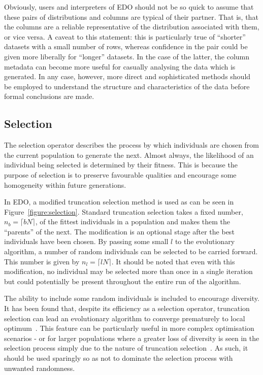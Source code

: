 Obviously, users and interpreters of EDO should not be so quick to assume that
these pairs of distributions and columns are typical of their partner. That is,
that the columns are a reliable representative of the distribution associated
with them, or vice versa. A caveat to this statement: this is particularly true
of ``shorter'' datasets with a small number of rows, whereas confidence in the
pair could be given more liberally for ``longer'' datasets. In the case of the
latter, the column metadata can become more useful for casually analysing the
data which is generated. In any case, however, more direct and sophisticated
methods should be employed to understand the structure and characteristics of
the data before formal conclusions are made.



\subsection{Selection}

The selection operator describes the process by which individuals are chosen
from the current population to generate the next. Almost always, the likelihood
of an individual being selected is determined by their fitness. This is because
the purpose of selection is to preserve favourable qualities and encourage some
homogeneity within future generations.


In EDO, a modified truncation selection method is used as can be seen in
Figure~\ref{figure:selection}. Standard truncation selection takes a fixed
number, \(n_b = \lceil bN\rceil\), of the fittest individuals in a population
and makes them the ``parents'' of the next. The modification is an optional
stage after the best individuals have been chosen. By passing some small \(l\)
to the evolutionary algorithm, a number of random individuals can be selected to
be carried forward. This number is given by \(n_l = \lceil lN \rceil\). It
should be noted that even with this modification, no individual may be selected
more than once in a single iteration but could potentially be present throughout
the entire run of the algorithm.



The ability to include some random individuals is included to encourage
diversity. It has been found that, despite its efficiency as a selection
operator, truncation selection can lead an evolutionary algorithm to
converge prematurely to local optimum~\cite{Jebari2013}. This feature can be
particularly useful in more complex optimisation scenarios \-- or for larger
populations where a greater loss of diversity is seen in the selection process
simply due to the nature of truncation selection~\cite{Tatsuya2002}. As such, it
should be used sparingly so as not to dominate the selection process with
unwanted randomness.

